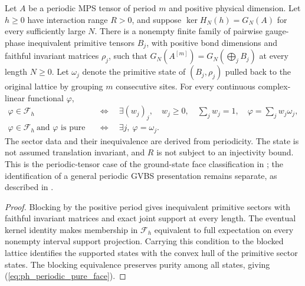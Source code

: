 \begin{lemma}
    \label{thm:periodic_quasi_local_ground_state_classification}
    \leanok
    Let $A$ be a periodic MPS tensor of period $m$ and positive physical
    dimension. Let $h\geq0$ have interaction range $R>0$, and suppose
    $\ker H_N(h)=G_N(A)$ for every sufficiently large $N$.
    There is a nonempty finite family of pairwise gauge-phase inequivalent
    primitive tensors $B_j$, with positive bond dimensions and faithful
    invariant matrices $\rho_j$, such that $G_N(A^{[m]})=
        G_N(\bigoplus_j B_j)$ at every length $N\geq0$.
    Let $\omega_j$ denote the primitive state of $(B_j,\rho_j)$ pulled back
    to the original lattice by grouping $m$ consecutive sites. For every
    continuous complex-linear functional $\varphi$,
    \begin{align}
        \varphi\in\mathcal F_h
         & \quad\Longleftrightarrow\quad
        \exists (w_j)_j,\quad w_j\geq0,\quad
        \sum_j w_j=1,\quad \varphi=\sum_j w_j\omega_j,
        \label{eq:ph_periodic_ground_face}                             \\
        \varphi\in\mathcal F_h\ \text{and }\varphi\text{ is pure}
         & \quad\Longleftrightarrow\quad \exists j,\ \varphi=\omega_j.
        \label{eq:ph_periodic_pure_face}
    \end{align}
    The sector data and their inequivalence are derived from periodicity.
    The state is not assumed translation invariant, and $R$ is not subject
    to an injectivity bound. This is the periodic-tensor case of the
    ground-state face classification in
    \cite[Theorems~1.1--1.2 and Section~3]{Nachtergaele1996Spectral}; the
    identification of a general periodic GVBS presentation remains separate,
    as described in \cite{gap:nachtergaele96_infinite_volume_ground_projection}.
\end{lemma}
\begin{proof}\leanok
    Blocking by the positive period gives inequivalent primitive sectors
    with faithful invariant matrices and exact joint support at every
    length. The eventual kernel identity makes membership in
    $\mathcal F_h$ equivalent to full expectation on every nonempty
    interval support projection. Carrying this condition to the blocked
    lattice identifies the supported states with the convex hull of the
    primitive sector states. The blocking equivalence preserves purity
    among all states, giving (\ref{eq:ph_periodic_pure_face}).
\end{proof}

